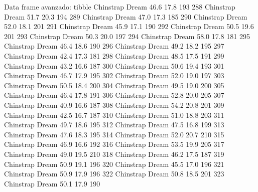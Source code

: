 \documentclass[
  ignorenonframetext,
  aspectratio=169]{beamer}
\let\oldverbatim\verbatim
\let\endoldverbatim\endverbatim
\renewenvironment{verbatim}{\tiny\oldverbatim}{\endoldverbatim}
\begin{document}
\begin{frame}[fragile]{Data frame avanzado: tibble}
\begin{verbatim}
287 Chinstrap     Dream           46.6          17.8               193
288 Chinstrap     Dream           51.7          20.3               194
289 Chinstrap     Dream           47.0          17.3               185
290 Chinstrap     Dream           52.0          18.1               201
291 Chinstrap     Dream           45.9          17.1               190
292 Chinstrap     Dream           50.5          19.6               201
293 Chinstrap     Dream           50.3          20.0               197
294 Chinstrap     Dream           58.0          17.8               181
295 Chinstrap     Dream           46.4          18.6               190
296 Chinstrap     Dream           49.2          18.2               195
297 Chinstrap     Dream           42.4          17.3               181
298 Chinstrap     Dream           48.5          17.5               191
299 Chinstrap     Dream           43.2          16.6               187
300 Chinstrap     Dream           50.6          19.4               193
301 Chinstrap     Dream           46.7          17.9               195
302 Chinstrap     Dream           52.0          19.0               197
303 Chinstrap     Dream           50.5          18.4               200
304 Chinstrap     Dream           49.5          19.0               200
305 Chinstrap     Dream           46.4          17.8               191
306 Chinstrap     Dream           52.8          20.0               205
307 Chinstrap     Dream           40.9          16.6               187
308 Chinstrap     Dream           54.2          20.8               201
309 Chinstrap     Dream           42.5          16.7               187
310 Chinstrap     Dream           51.0          18.8               203
311 Chinstrap     Dream           49.7          18.6               195
312 Chinstrap     Dream           47.5          16.8               199
313 Chinstrap     Dream           47.6          18.3               195
314 Chinstrap     Dream           52.0          20.7               210
315 Chinstrap     Dream           46.9          16.6               192
316 Chinstrap     Dream           53.5          19.9               205
317 Chinstrap     Dream           49.0          19.5               210
318 Chinstrap     Dream           46.2          17.5               187
319 Chinstrap     Dream           50.9          19.1               196
320 Chinstrap     Dream           45.5          17.0               196
321 Chinstrap     Dream           50.9          17.9               196
322 Chinstrap     Dream           50.8          18.5               201
323 Chinstrap     Dream           50.1          17.9               190

\end{verbatim}
\end{frame}
\end{document}
